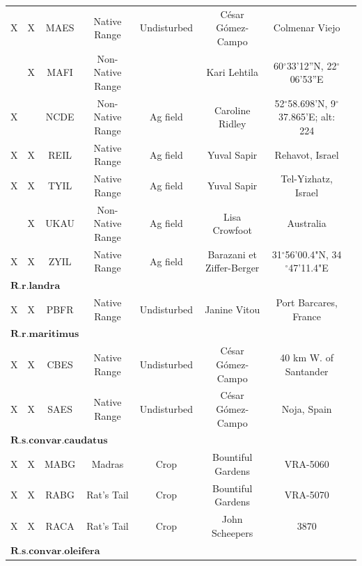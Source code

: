 \documentclass[twocolumn]{bmcart}%
\begin{document}
\begin{backmatter}
\begin{table}[p]
\begin{tabular}{cccccccc}
X & X & MAES & Native Range & Undisturbed & César Gómez-Campo & Colmenar Viejo\\
 & X & MAFI & Non-Native Range &  & Kari Lehtila & 60{\ensuremath{^\circ}}33'12''N, 22{\ensuremath{^\circ}}06'53''E\\
X &  & NCDE & Non-Native Range & Ag field & Caroline Ridley & 52{\ensuremath{^\circ}}58.698'N, 9{\ensuremath{^\circ}}37.865'E; alt: 224\\
X & X & REIL & Native Range & Ag field & Yuval Sapir & Rehavot, Israel\\
X & X & TYIL & Native Range & Ag field & Yuval Sapir & Tel-Yizhatz, Israel\\
 & X & UKAU & Non-Native Range & Ag field & Lisa Crowfoot & Australia\\
X & X & ZYIL & Native Range & Ag field & Barazani et Ziffer-Berger & 31{\ensuremath{^\circ}}56'00.4"N, 34{\ensuremath{^\circ}}47'11.4"E\\ \hline
\multicolumn{5}{l}{$\boldsymbol{R.r. landra}$}\\
X & X & PBFR & Native Range & Undisturbed & Janine Vitou & Port Barcares, France\\ \hline
\multicolumn{5}{l}{$\boldsymbol{R.r. maritimus}$}\\
X & X & CBES & Native Range & Undisturbed & César Gómez-Campo & 40 km W. of Santander\\
X & X & SAES & Native Range & Undisturbed & César Gómez-Campo & Noja, Spain\\ \hline
 \multicolumn{5}{l}{$\boldsymbol{R. s. convar. caudatus}$} \\
X & X & MABG & Madras & Crop & Bountiful Gardens & VRA-5060\\
X & X & RABG & Rat's Tail & Crop & Bountiful Gardens & VRA-5070\\
X & X & RACA & Rat's Tail & Crop & John Scheepers & 3870\\ \hline
\multicolumn{5}{l}{$\boldsymbol{R. s. convar. oleifera}$} \\

\end{tabular}
\end{table}
\end{backmatter}
\end{document}
